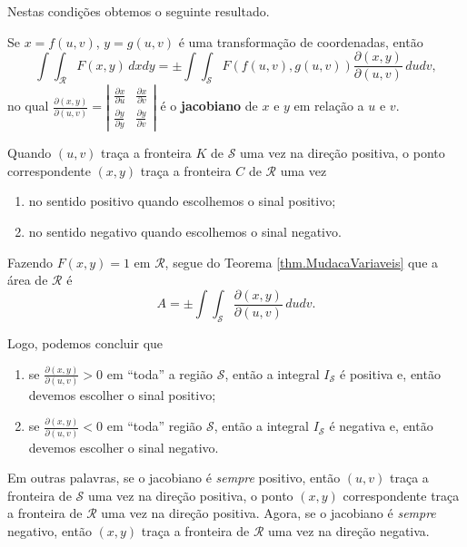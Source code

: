 Nestas condições obtemos o seguinte resultado.

\begin{theorem}\label{thm.MudacaVariaveis}
    Se \(x = f(u,v)\), \(y = g(u,v)\) é uma transformação de coordenadas, então \[\int\int_\mathcal{R} F(x,y) \,dxdy = \pm \int\int_\mathcal{S} F(f(u,v),g(u,v)) \frac{\partial(x,y)}{\partial(u,v)}\, dudv, \] no qual \(\frac{\partial(x,y)}{\partial(u,v)} = \left|\begin{matrix}
        \frac{\partial x}{\partial u} & \frac{\partial x}{\partial v} \\ \frac{\partial y}{\partial y} & \frac{\partial y}{\partial v}
    \end{matrix}\right|\) é o \textbf{jacobiano} de \(x\) e \(y\) em relação a \(u\) e \(v\).
\end{theorem}

\begin{remark}
    Quando \((u,v)\) traça a fronteira \(K\) de \(\mathcal{S}\) uma vez na direção positiva, o ponto correspondente \((x,y)\) traça a fronteira \(C\) de \(\mathcal{R}\) uma vez
        \begin{enumerate}
            \item no sentido positivo quando escolhemos o sinal positivo;
            \item no sentido negativo quando escolhemos o sinal negativo.
        \end{enumerate}
\end{remark}

\begin{remark}
    Fazendo \(F(x,y) = 1\) em \(\mathcal{R}\), segue do Teorema \ref{thm.MudacaVariaveis} que a área de \(\mathcal{R}\) é \[A = \pm \int\int_\mathcal{S} \frac{\partial(x,y)}{\partial(u,v)} \,dudv.\]

    Logo, podemos concluir que
        \begin{enumerate}
            \item se \(\frac{\partial(x,y)}{\partial(u,v)} > 0\) em ``toda'' a região \(\mathcal{S}\), então a integral \(I_\mathcal{S}\) é positiva e, então devemos escolher o sinal positivo;
            \item se \(\frac{\partial(x,y)}{\partial(u,v)} < 0\) em ``toda'' região \(\mathcal{S}\), então a integral \(I_\mathcal{S}\) é negativa e, então devemos escolher o sinal negativo.
        \end{enumerate}

    Em outras palavras, se o jacobiano é \textit{sempre} positivo, então \((u,v)\) traça a fronteira de \(\mathcal{S}\) uma vez na direção positiva, o ponto \((x,y)\) correspondente traça a fronteira de \(\mathcal{R}\) uma vez na direção positiva. Agora, se o jacobiano é \textit{sempre} negativo, então \((x,y)\) traça a fronteira de \(\mathcal{R}\) uma vez na direção negativa.
\end{remark}

